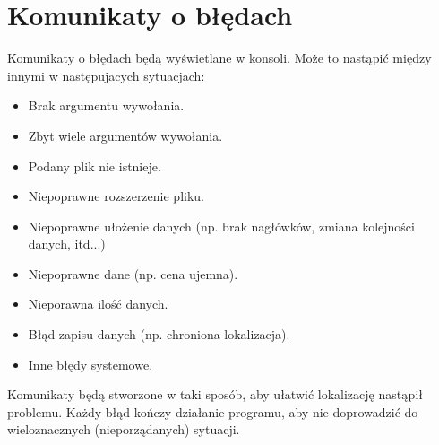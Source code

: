 \documentclass{article}
\begin{document}
\section{Komunikaty o błędach}
{\fontsize{12}{12}\selectfont
    Komunikaty o błędach będą wyświetlane w konsoli.
    Może to nastąpić między innymi w następujacych sytuacjach:
    
   \begin{itemize}
        \item Brak argumentu wywołania.
        \item Zbyt wiele argumentów wywołania.
        \item Podany plik nie istnieje.
        \item Niepoprawne rozszerzenie pliku.
        \item Niepoprawne ułożenie danych (np. brak nagłówków, zmiana kolejności danych, itd...)
        \item Niepoprawne dane (np. cena ujemna).
        \item Nieporawna ilość danych.
        \item Błąd zapisu danych (np. chroniona lokalizacja).
        \item Inne błędy systemowe.
   \end{itemize}
   
   Komunikaty będą stworzone w taki sposób, aby ułatwić lokalizację nastąpił problemu.
   Każdy błąd kończy działanie programu, aby nie doprowadzić do wieloznacznych (nieporządanych) sytuacji.


}
\end{document}
